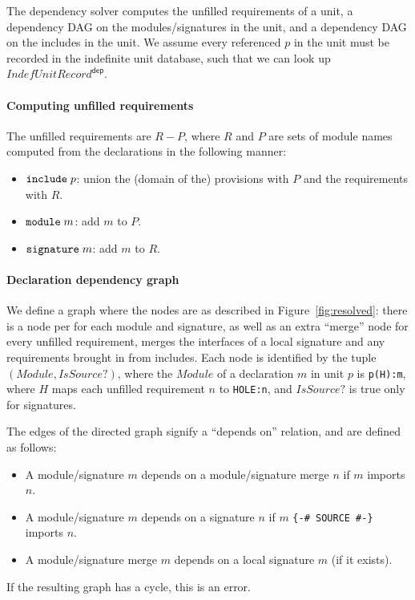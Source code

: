 \documentclass{article}
\newcommand{\I}[1]{\ensuremath{\mathit{#1}}}
\begin{document}
The dependency solver computes the unfilled requirements of a unit, a
dependency DAG on the modules/signatures in the unit, and a dependency
DAG on the includes in the unit.  We assume every referenced $p$ in the
unit must be recorded in the indefinite unit database, such that we can
look up $\I{IndefUnitRecord}^{\mathsf{dep}}$.

\paragraph{Computing unfilled requirements}  The unfilled requirements are $R-P$, where $R$ and $P$ are sets of module names computed from the declarations in the following manner:

\begin{itemize}
    \item $\verb|include|\; p$: union the (domain of the) provisions with $P$ and the requirements with $R$.
    \item $\verb|module|\; m$: add $m$ to $P$.
    \item $\verb|signature|\; m$: add $m$ to $R$.
\end{itemize}

\paragraph{Declaration dependency graph}
We define a graph where the nodes are as described in Figure~\ref{fig:resolved}:
there is a node per
for each module and signature, as well as an extra ``merge'' node for
every unfilled requirement, merges the interfaces of a local signature and
any requirements brought in from includes.
%
Each node is identified by the tuple $\left(\I{Module}, \I{IsSource?}\right)$, where
the \I{Module} of a declaration $m$ in unit $p$ is \verb|p(H):m|, where $H$ maps
each unfilled requirement $n$ to \verb|HOLE:n|, and \I{IsSource?} is true only for signatures.

The edges of the directed graph signify a ``depends on'' relation, and are
defined as follows:

\begin{itemize}
    \item A module/signature $m$ depends on a module/signature merge $n$ if $m$ imports $n$.
    \item A module/signature $m$ depends on a signature $n$ if $m$ \verb|{-# SOURCE #-}| imports $n$.
    \item A module/signature merge $m$ depends on a local signature $m$ (if it exists).
\end{itemize}
%
If the resulting graph has a cycle, this is an error.
\end{document}
